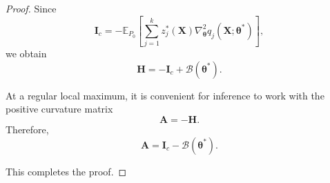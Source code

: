 \documentclass[pdflatex,sn-mathphys-ay]{sn-jnl}%
\let\oldtheta\theta
\renewcommand{\theta}{\boldsymbol{\oldtheta}}
\let\oldalpha\alpha
\renewcommand{\alpha}{\boldsymbol{\oldalpha}}
\theoremstyle{thmstyleone}%
\newtheorem{theorem}{Theorem}%
\theoremstyle{thmstyletwo}%
\theoremstyle{thmstylethree}%
\begin{document}
\begin{proof}
Since
\[
    \mathbf{I}_c
    =
    -
    \mathbb{E}_{P_0}
    \left[
        \sum_{j=1}^k
        z_j^*(\mathbf{X})
        \nabla_{\boldsymbol{\theta}}^2
        q_j(\mathbf{X};\boldsymbol{\theta}^*)
    \right],
\]
we obtain
\[
    \mathbf{H}
    =
    -\mathbf{I}_c
    +
    \mathcal{B}
    (\boldsymbol{\theta}^*).
\]

At a regular local maximum, it is convenient for inference to work with the positive curvature matrix
\[
    \mathbf{A}
    =
    -\mathbf{H}.
\]
Therefore,
\[
    \mathbf{A}
    =
    \mathbf{I}_c
    -
    \mathcal{B}
    (\boldsymbol{\theta}^*).
\]

This completes the proof.

\end{proof}






\end{document}
